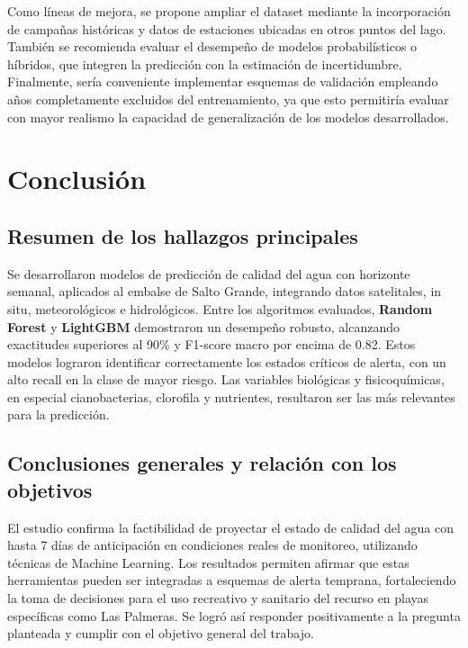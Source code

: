 \documentclass[11pt]{report}
\begin{document}
Como líneas de mejora, se propone ampliar el dataset mediante la incorporación de campañas históricas y datos de estaciones ubicadas en otros puntos del lago. También se recomienda evaluar el desempeño de modelos probabilísticos o híbridos, que integren la predicción con la estimación de incertidumbre. Finalmente, sería conveniente implementar esquemas de validación empleando años completamente excluidos del entrenamiento, ya que esto permitiría evaluar con mayor realismo la capacidad de generalización de los modelos desarrollados.

\chapter{Conclusión}

\section{Resumen de los hallazgos principales}

Se desarrollaron modelos de predicción de calidad del agua con horizonte semanal, aplicados al embalse de Salto Grande, integrando datos satelitales, in situ, meteorológicos e hidrológicos. Entre los algoritmos evaluados, \textbf{Random Forest} y \textbf{LightGBM} demostraron un desempeño robusto, alcanzando exactitudes superiores al 90\% y F1-score macro por encima de 0.82. Estos modelos lograron identificar correctamente los estados críticos de alerta, con un alto recall en la clase de mayor riesgo. Las variables biológicas y fisicoquímicas, en especial cianobacterias, clorofila y nutrientes, resultaron ser las más relevantes para la predicción.

\section{Conclusiones generales y relación con los objetivos}

El estudio confirma la factibilidad de proyectar el estado de calidad del agua con hasta 7 días de anticipación en condiciones reales de monitoreo, utilizando técnicas de Machine Learning. Los resultados permiten afirmar que estas herramientas pueden ser integradas a esquemas de alerta temprana, fortaleciendo la toma de decisiones para el uso recreativo y sanitario del recurso en playas específicas como Las Palmeras. Se logró así responder positivamente a la pregunta planteada y cumplir con el objetivo general del trabajo.
\end{document}
